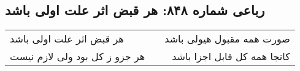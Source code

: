 \begin{center}
\section*{رباعی شماره ۸۴۸: هر قبض اثر علت اولی باشد}
\label{sec:0848}
\begin{longtable}{l p{0.5cm} r}
هر قبض اثر علت اولی باشد
&&
صورت همه مقبول هیولی باشد
\\
هر جزو ز کل بود ولی لازم نیست
&&
کانجا همه کل قابل اجزا باشد
\\
\end{longtable}
\end{center}
